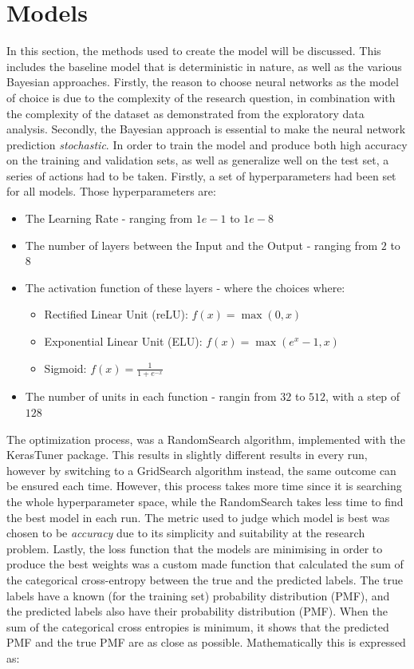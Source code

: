 \documentclass[11pt,twoside]{article}
\numberwithin{Theorem}{section}
\numberwithin{Definition}{section}
\numberwithin{Lemma}{section}
\numberwithin{Algorithm}{section}
\numberwithin{equation}{section}
\begin{document}
\section{Models}
\label{sec:methods}
In this section, the methods used to create the model will be discussed. This includes the baseline model that is deterministic in nature, as well as the various Bayesian approaches. Firstly, the reason to choose neural networks as the model of choice is due to the complexity of the research question, in combination with the complexity of the dataset as demonstrated from the exploratory data analysis. Secondly, the Bayesian approach is essential to make the neural network prediction \textit{stochastic}.
In order to train the model and produce both high accuracy on the training and validation sets, as well as generalize well on the test set, a series of actions had to be taken. Firstly, a set of hyperparameters had been set for all models. Those hyperparameters are:
\begin{itemize}
\item The Learning Rate - ranging from $1e-1$ to $1e-8$
\item The number of layers between the Input and the Output - ranging from $2$ to $8$
\item The activation function of these layers - where the choices where:
\begin{itemize}
\item Rectified Linear Unit (reLU): $f(x) = \max(0,x)$
\item Exponential Linear Unit (ELU): $f(x) = \max(e^x-1,x)$
\item Sigmoid: $f(x)=\frac{1}{1+e^{-x}}$
\end{itemize}
\item The number of units in each function - rangin from $32$ to $512$, with a step of $128$
\end{itemize}
The optimization process, was a \textsf{RandomSearch} algorithm, implemented with the \textsf{KerasTuner} package. This results in slightly different results in every run, however by switching to a \textsf{GridSearch} algorithm instead, the same outcome can be ensured each time. However, this process takes more time since it is searching the whole hyperparameter space, while the \textsf{RandomSearch} takes less time to find the best model in each run. The metric used to judge which model is best was chosen to be \textit{accuracy} due to its simplicity and suitability at the research problem. Lastly, the loss function that the models are minimising in order to produce the best weights was a custom made function that calculated the sum of the categorical cross-entropy between the true and the predicted labels. The true labels have a known (for the training set) probability distribution (PMF), and the predicted labels also have their probability distribution (PMF). When the sum of the categorical cross entropies is minimum, it shows that the predicted PMF and the true PMF are as close as possible. Mathematically this is expressed as:
\end{document}
